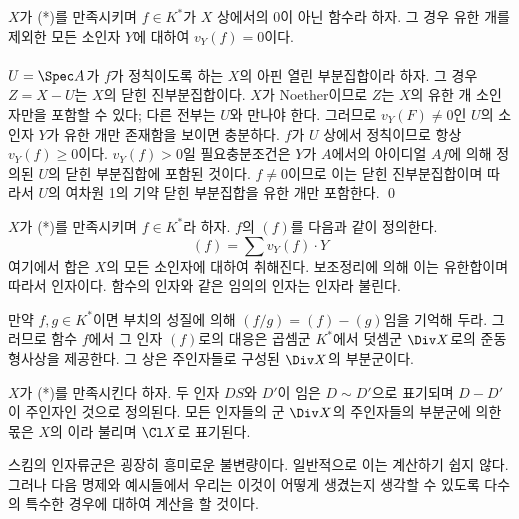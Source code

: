 	
	\begin{lemma}
	$X$가 (*)를 만족시키며 $f\in K^*$가 $X$ 상에서의 0이 아닌 함수라 하자.
	그 경우 유한 개를 제외한 모든 소인자 $Y$에 대하여 $v_Y(f)=0$이다.\\\\
	\pf $U=\Spec A$가 $f$가 정칙이도록 하는 $X$의 아핀 열린 부분집합이라 하자.	
	그 경우 $Z=X-U$는 $X$의 닫힌 진부분집합이다. $X$가 Noether이므로 $Z$는 $X$의 유한 개 소인자만을 포함할 수 있다;
	다른 전부는 $U$와 만나야 한다. 그러므로 $v_Y(F)\ne 0$인 $U$의 소인자 $Y$가 유한 개만 존재함을 보이면 충분하다.
	$f$가 $U$ 상에서 정칙이므로 항상 $v_Y(f)\ge 0$이다.
	$v_Y(f)>0$일 필요충분조건은 $Y$가 $A$에서의 아이디얼 $Af$에 의해 정의된 $U$의 닫힌 부분집합에 포함된 것이다.
	$f\ne 0$이므로 이는 닫힌 진부분집합이며 따라서 $U$의 여차원 1의 기약 닫힌 부분집합을 유한 개만 포함한다.
	\qed
	\end{lemma}
	
	
	\begin{definition}
	$X$가 (*)를 만족시키며 $f\in K^*$라 하자. $f$의  $(f)$를 다음과 같이 정의한다.
	$$(f)=\sum v_Y(f)\cdot Y$$
	여기에서 합은 $X$의 모든 소인자에 대하여 취해진다. 보조정리에 의해 이는 유한합이며 따라서 인자이다.
	함수의 인자와 같은 임의의 인자는  인자라 불린다.
	\end{definition}
	
	만약 $f,g\in K^*$이면 부치의 성질에 의해 $(f/g)=(f)-(g)$임을 기억해 두라.
	그러므로 함수 $f$에서 그 인자 $(f)$로의 대응은 곱셈군 $K^*$에서 덧셈군 $\Div X$로의 준동형사상을 제공한다.
	그 상은 주인자들로 구성된 $\Div X$의 부분군이다.
	
	
	\begin{definition}
	$X$가 (*)를 만족시킨다 하자.
	두 인자 $DS$와 $D'$이 임은 $D\sim D'$으로 표기되며 $D-D'$이 주인자인 것으로 정의된다.
	모든 인자들의 군 $\Div X$의 주인자들의 부분군에 의한 몫은 $X$의 이라 불리며 $\Cl X$로 표기된다.
	\end{definition}
	
	스킴의 인자류군은 굉장히 흥미로운 불변량이다. 일반적으로 이는 계산하기 쉽지 않다.
	그러나 다음 명제와 예시들에서 우리는 이것이 어떻게 생겼는지 생각할 수 있도록 다수의 특수한 경우에 대하여 계산을 할 것이다.
	
